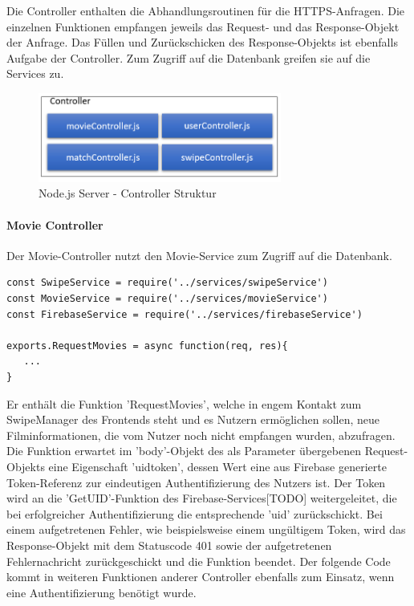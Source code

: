 Die Controller enthalten die Abhandlungsroutinen für die HTTPS-Anfragen. Die einzelnen Funktionen empfangen jeweils das Request- und das Response-Objekt der Anfrage. Das Füllen und Zurückschicken des Response-Objekts ist ebenfalls Aufgabe der Controller. Zum Zugriff auf die Datenbank greifen sie auf die Services zu.



\begin{figure}[h]
\centering
\includegraphics[width=8cm]{images/controllerStruktur.PNG}
\caption{Node.js Server - Controller Struktur}
\end{figure}

\paragraph{Movie Controller}

Der Movie-Controller nutzt den Movie-Service zum Zugriff auf die Datenbank. 
\begin{lstlisting}[caption=movieController.js Imports und Funktionen, label=lst:movieController.js]
const SwipeService = require('../services/swipeService')
const MovieService = require('../services/movieService')
const FirebaseService = require('../services/firebaseService')

exports.RequestMovies = async function(req, res){
   ...
}
\end{lstlisting}

Er enthält die Funktion 'RequestMovies', welche in engem Kontakt zum SwipeManager des Frontends steht und es Nutzern ermöglichen sollen, neue Filminformationen, die vom Nutzer noch nicht empfangen wurden, abzufragen.
\newline
Die Funktion erwartet im 'body'-Objekt des als Parameter übergebenen Request-Objekts eine Eigenschaft 'uidtoken', dessen Wert eine aus Firebase generierte Token-Referenz zur eindeutigen Authentifizierung des Nutzers ist. Der Token wird an die 'GetUID'-Funktion des Firebase-Services[TODO] weitergeleitet, die bei erfolgreicher Authentifizierung die entsprechende 'uid' zurückschickt. Bei einem aufgetretenen Fehler, wie beispielsweise einem ungültigem Token, wird das Response-Objekt mit dem Statuscode 401 sowie der aufgetretenen Fehlernachricht zurückgeschickt und die Funktion beendet. Der folgende Code kommt in weiteren Funktionen anderer Controller ebenfalls zum Einsatz, wenn eine Authentifizierung benötigt wurde.

